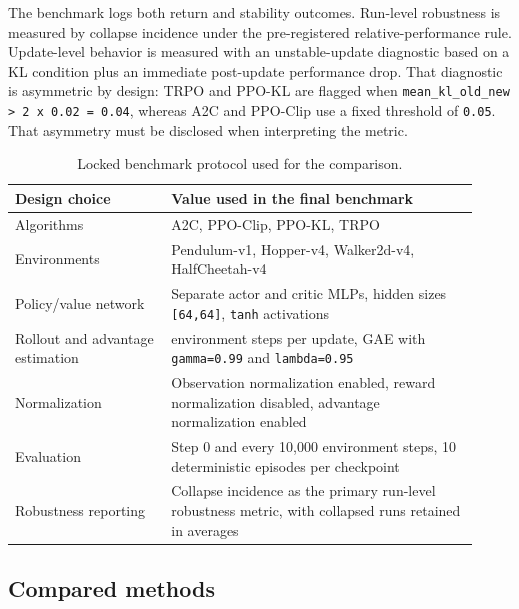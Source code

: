 \documentclass{article}
\begin{document}
The benchmark logs both return and stability outcomes. Run-level robustness is measured by collapse incidence under the pre-registered relative-performance rule. Update-level behavior is measured with an unstable-update diagnostic based on a KL condition plus an immediate post-update performance drop. That diagnostic is asymmetric by design: TRPO and PPO-KL are flagged when \texttt{mean\_kl\_old\_new > 2 x 0.02 = 0.04}, whereas A2C and PPO-Clip use a fixed threshold of \texttt{0.05}. That asymmetry must be disclosed when interpreting the metric.

\begin{table}[t]
  \caption{Locked benchmark protocol used for the comparison.}
  \label{tab:protocol}
  \centering
  \small
  \begin{tabular}{>{\raggedright\arraybackslash}p{0.31\linewidth}>{\raggedright\arraybackslash}p{0.61\linewidth}}
    \toprule
    Design choice & Value used in the final benchmark \\
    \midrule
    Algorithms & A2C, PPO-Clip, PPO-KL, TRPO \\
    Environments & Pendulum-v1, Hopper-v4, Walker2d-v4, HalfCheetah-v4 \\
    Policy/value network & Separate actor and critic MLPs, hidden sizes \texttt{[64,64]}, \texttt{tanh} activations \\
    Rollout and advantage estimation & 2048 environment steps per update, GAE with \texttt{gamma=0.99} and \texttt{lambda=0.95} \\
    Normalization & Observation normalization enabled, reward normalization disabled, advantage normalization enabled \\
    Evaluation & Step 0 and every 10,000 environment steps, 10 deterministic episodes per checkpoint \\
    Robustness reporting & Collapse incidence as the primary run-level robustness metric, with collapsed runs retained in averages \\
    \bottomrule
  \end{tabular}
\end{table}

\subsection{Compared methods}
\end{document}
